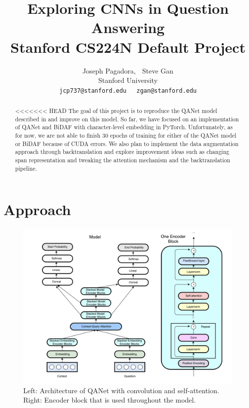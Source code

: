 \documentclass{article}
\title{
  Exploring CNNs in Question Answering \\
  \vspace{1em}
  \small{\normalfont Stanford CS224N Default Project}  %
}
\author{
  Joseph Pagadora, $\;$ Steve Gan \\
  Stanford University \\
  \texttt{jcp737@stanford.edu}$\;\;\;\;$
  \texttt{zgan@stanford.edu} \\
}
\begin{document}
\maketitle


\begin{abstract}
<<<<<<< HEAD
The goal of this project is to reproduce the QANet model described in \cite{YU} and improve on this model. So far, we have focused on an implementation of QANet and BiDAF with character-level embedding in PyTorch. Unfortunately, as for now, we are not able to finish 30 epochs of training for either of the QANet model or BiDAF because of CUDA errors. We also plan to implement the data augmentation approach through backtranslation and explore improvement ideas such as changing span representation and tweaking the attention mechanism and the backtranslation pipeline.
\end{abstract}

\section{Approach}

\begin{figure}[h]
\centering
\includegraphics[scale=0.23]{model_diagram}
\caption{Left: Architecture of QANet with convolution and self-attention. Right: Encoder block that is used throughout the model.}
\end{figure}
\end{document}
